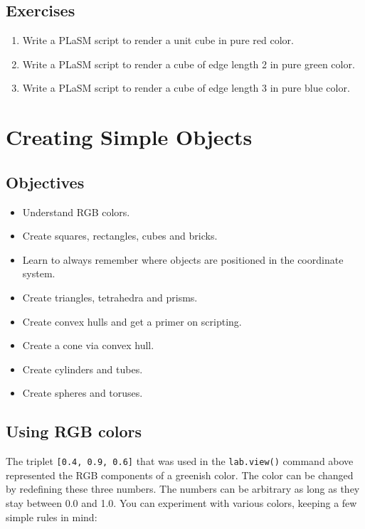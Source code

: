 \documentclass{article}
\begin{document}
\subsection{Exercises}

\begin{enumerate}
\item Write a PLaSM script to render a unit cube in pure red color.
\item Write a PLaSM script to render a cube of edge length 2 in pure green color.
\item Write a PLaSM script to render a cube of edge length 3 in pure blue color.
\end{enumerate}

\newpage
\section{Creating Simple Objects}

\subsection{Objectives}
\begin{itemize}
\item Understand RGB colors.
\item Create squares, rectangles, cubes and bricks.
\item Learn to always remember where objects are positioned in the coordinate system.
\item Create triangles, tetrahedra and prisms.
\item Create convex hulls and get a primer on scripting.
\item Create a cone via convex hull.
\item Create cylinders and tubes.
\item Create spheres and toruses.
\end{itemize}


\subsection{Using RGB colors} \label{subsec:colors}

The triplet {\tt [0.4, 0.9, 0.6]} that was used in the {\tt lab.view()} command
above represented the RGB components of a greenish color. The color can be changed 
by redefining these three numbers. The numbers can be arbitrary as long as they stay 
between 0.0 and 1.0. You can experiment with various colors, keeping a few 
simple rules in mind:
\end{document}
